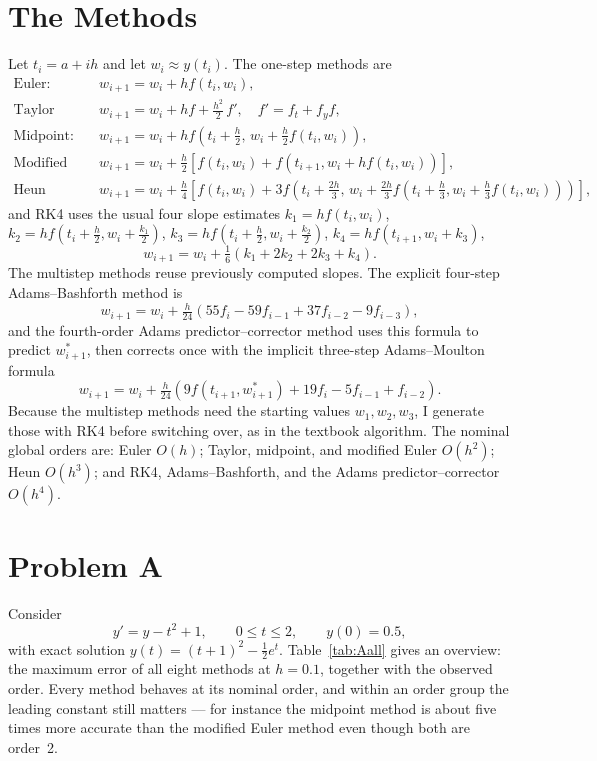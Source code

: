 \documentclass[11pt]{article}
\begin{document}
\section{The Methods}
Let $t_i = a + ih$ and let $w_i \approx y(t_i)$. The one-step methods are
\begin{align*}
\text{Euler:}\quad & w_{i+1} = w_i + h f(t_i,w_i), \\
\text{Taylor (order 2):}\quad & w_{i+1} = w_i + h f + \tfrac{h^2}{2}\,f',
   \quad f' = f_t + f_y f, \\
\text{Midpoint:}\quad & w_{i+1} = w_i + h f\!\left(t_i+\tfrac{h}{2},\,
   w_i + \tfrac{h}{2}f(t_i,w_i)\right), \\
\text{Modified Euler:}\quad & w_{i+1} = w_i + \tfrac{h}{2}
   \left[f(t_i,w_i) + f\!\left(t_{i+1}, w_i + h f(t_i,w_i)\right)\right], \\
\text{Heun (order 3):}\quad & w_{i+1} = w_i + \tfrac{h}{4}
   \left[f(t_i,w_i) + 3 f\!\left(t_i+\tfrac{2h}{3},\,
   w_i + \tfrac{2h}{3}f\!\left(t_i+\tfrac{h}{3}, w_i+\tfrac{h}{3}f(t_i,w_i)\right)\right)\right],
\end{align*}
and RK4 uses the usual four slope estimates
$k_1 = hf(t_i,w_i)$, $k_2 = hf(t_i+\tfrac h2, w_i+\tfrac{k_1}{2})$,
$k_3 = hf(t_i+\tfrac h2, w_i+\tfrac{k_2}{2})$, $k_4 = hf(t_{i+1}, w_i+k_3)$,
\[
w_{i+1} = w_i + \tfrac16(k_1 + 2k_2 + 2k_3 + k_4).
\]
The multistep methods reuse previously computed slopes. The explicit four-step
Adams--Bashforth method is
\[
w_{i+1} = w_i + \tfrac{h}{24}\left(55 f_i - 59 f_{i-1} + 37 f_{i-2} - 9 f_{i-3}\right),
\]
and the fourth-order Adams predictor--corrector method uses this formula to
predict $w_{i+1}^\ast$, then corrects once with the implicit three-step
Adams--Moulton formula
\[
w_{i+1} = w_i + \tfrac{h}{24}\left(9 f(t_{i+1}, w_{i+1}^\ast) + 19 f_i - 5 f_{i-1} + f_{i-2}\right).
\]
Because the multistep methods need the starting values $w_1, w_2, w_3$, I
generate those with RK4 before switching over, as in the textbook algorithm.
The nominal global orders are: Euler $O(h)$; Taylor, midpoint, and modified
Euler $O(h^2)$; Heun $O(h^3)$; and RK4, Adams--Bashforth, and the Adams
predictor--corrector $O(h^4)$.

\section{Problem A}
Consider
\[
y' = y - t^2 + 1, \qquad 0 \le t \le 2, \qquad y(0) = 0.5,
\]
with exact solution $y(t) = (t+1)^2 - \tfrac12 e^t$.
Table~\ref{tab:Aall} gives an overview: the maximum error of all eight methods
at $h = 0.1$, together with the observed order. Every method behaves at its
nominal order, and within an order group the leading constant still matters ---
for instance the midpoint method is about five times more accurate than the
modified Euler method even though both are order~2.
\end{document}
